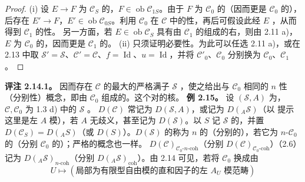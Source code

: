 \begin{proof}
(i) 设 $E\to F$ 为 $\mathscr C_S$ 的，$F\in\operatorname{ob}\mathscr C_{1S}$。由于 $F$ 为 $\mathscr C_0$ 的（因而更是 $\mathscr C_0$ 的），后存在 $E'\to F$，$E'\in\operatorname{ob}\mathscr C_{0S}$。利用 $\mathscr C_0$ 在 $\mathscr C$ 中的性，再后可假设此经 $E$ ，从而得到 $\mathscr C_1$ 的性。
另一方面，若 $E\in\operatorname{ob}\mathscr C_S$ 具有由 $\mathscr C_1$ 的组成的右，则由 2.11 a)，$E$ 为 $\mathscr C_0$ 的，因而更是 $\mathscr C_1$ 的。
(ii) 只须证明必要性。为此可以任选 2.11 a)，或在 2.13 中取 $\mathscr S'=\mathscr S$、$\mathscr C'=\mathscr C$、$f=\operatorname{Id}$、$u=\operatorname{Id}$，并将 $\mathscr C'_0$、$\mathscr C_0$ 分别换为 $\mathscr C_0$、$\mathscr C_1$。
\end{proof}
\textbf{评注 2.14.1。} 因而存在 $\mathscr C$ 的最大的严格满子 $\mathscr S$ ，使之给出与 $\mathscr C_0$ 相同的 $n$ 性（分别性）概念，即由 $\mathscr C_0$ 组成的。这个对的核。
\textbf{例 2.15。} 设 $(\mathscr S,A)$ 为，$\mathscr C,\mathscr C_0$ 为 1.3 d) 中的 $\mathscr S$ 。 $D(\mathscr C)$ 常记为 $D(\mathscr S,A)$，或记为 $D({}_A\mathscr S)$（以
提示这里是左 $A$ 模），若 $A$ 无歧义，甚至记为 $D(\mathscr S)$。以 $S$ 记 $\mathscr S$ 的，并置 $D(\mathscr C_S)=D({}_AS)$（或 $D(S)$）。$D(\mathscr S)$ 的称为 $n$ 的（分别的），若它为 $n$-$\mathscr C_0$ 的（分别 $\mathscr C_0$ 的）；严格的概念也一样。 $D(\mathscr C)_{\mathscr C_0\text{-}n\text{-coh}}$（分别 $D(\mathscr C)_{\mathscr C_0\text{-coh}}$）（2.6）记为 $D({}_A\mathscr S)_{n\text{-coh}}$（分别 $D({}_A\mathscr S)_{\mathrm{coh}}$）。由 2.14 可见，若将 $\mathscr C_0$ 换成由
\[U\longmapsto(\text{局部为有限型自由模的直和因子的左 }A_U\text{ 模范畴})\]

